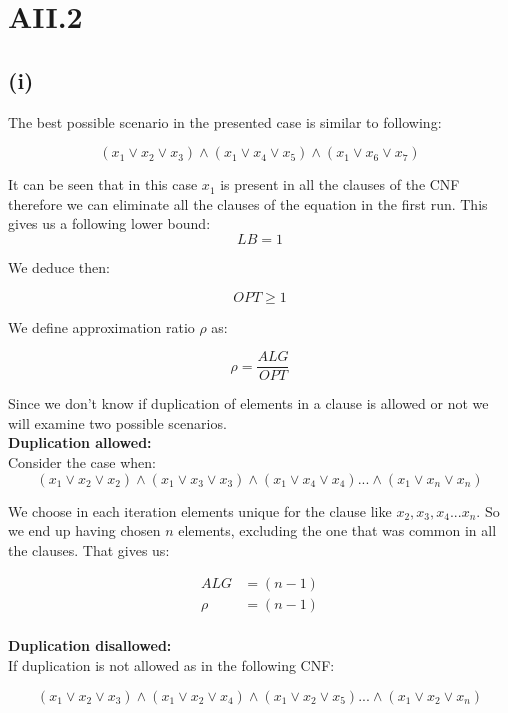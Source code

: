 \section* {AII.2}
\label {a2-2}
\subsection*{(i)}

The best possible scenario in the presented case is similar to following:

$$ (x_1 \vee x_2  \vee x_3) \wedge (x_1 \vee x_4 \vee x_5) \wedge (x_1 \vee x_6 \vee x_7) $$

It can be seen that in this case $ x_1 $ is present in all the clauses of the CNF therefore we can eliminate all the clauses of the equation in the first run. This gives us a following lower bound:
$$ LB = 1 $$ 

We deduce then:

$$ OPT \ge 1 $$

We define approximation ratio $ \rho $ as:

$$ \rho = \frac{ALG}{OPT} $$

Since we don't know if duplication of elements in a clause is allowed or not we will examine two possible scenarios.\\

\textbf{Duplication allowed:}\\

Consider the case when:\\

$$ (x_1 \vee x_2  \vee x_2) \wedge (x_1 \vee x_3 \vee x_3) \wedge (x_1 \vee x_4 \vee x_4) ... \wedge (x_1 \vee x_n \vee x_n) $$

We choose in each iteration elements unique for the clause like $ x_2 , x_3 , x_4 ... x_n $. So we end up having chosen $ n $ elements, excluding the one that was common in all the clauses. That gives us:

\begin{align*}
	ALG &= (n-1)\\
	\rho &= (n-1) \\
\end{align*}

\textbf{Duplication disallowed:}\\

If duplication is not allowed as in the following CNF:

$$ (x_1 \vee x_2  \vee x_3) \wedge (x_1 \vee x_2 \vee x_4) \wedge (x_1 \vee x_2 \vee x_5) ... \wedge (x_1 \vee x_2 \vee x_n) $$

